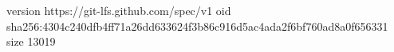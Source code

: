 version https://git-lfs.github.com/spec/v1
oid sha256:4304c240dfb4ff71a26dd633624f3b86c916d5ac4ada2f6bf760ad8a0f656331
size 13019
